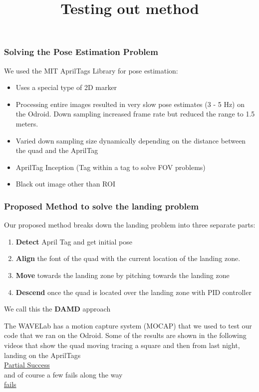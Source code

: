 \documentclass{beamer}
\begin{document}
\begin{frame}
	\frametitle{Solving the Pose Estimation Problem}
	We used the MIT AprilTags Library for pose estimation:
	\begin{itemize}
	\item Uses a special type of 2D marker
	\item Processing entire images resulted in very slow pose estimates (3 - 5 Hz) on the Odroid. Down sampling increased frame rate but reduced the range to 1.5 meters.	
	\item  Varied down sampling size dynamically depending on the distance between the quad and the AprilTag
	\item AprilTag Inception (Tag within a tag to solve FOV problems)
	\item Black out image other than ROI
\end{itemize}

\end{frame}


\begin{frame}
	\frametitle{Proposed Method to solve the landing problem}
	 Our proposed method breaks down the landing problem into three separate parts:
	\begin{enumerate}
	\item \textbf{Detect} April Tag and get initial pose
	\item \textbf{Align} the font of the quad with the current location of the landing zone.
	\item \textbf{Move} towards the landing zone by pitching towards the landing zone
	\item \textbf{Descend} once the quad is located over the landing zone with PID controller
	\end{enumerate}
	
	We call this the \textbf{DAMD} approach
	
\end{frame}
\begin{frame}
\title{Testing out method}
The WAVELab has a motion capture system (MOCAP) that we used to test our code that we ran on the Odroid. Some of the results are shown in the following videos that show the quad moving tracing a square and then from last night, landing on the AprilTags \\

\href{https://www.youtube.com/watch?v=9oUxANr1j0o}{Partial Success} \\
and of course a few fails along the way \\
\href{https://youtu.be/2i0S6vrP9oc?t=53}{fails}

\end{frame}	
\end{document}
